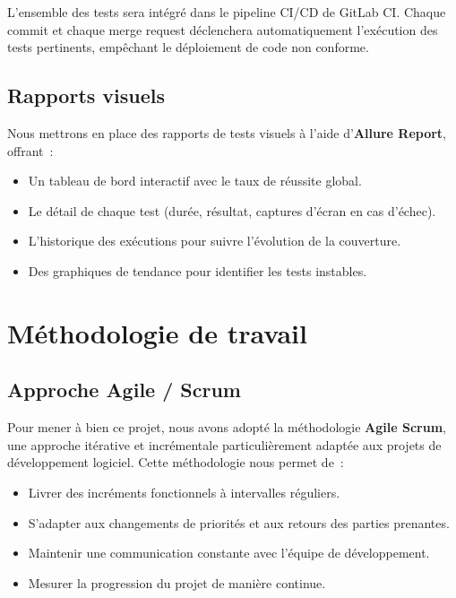 L'ensemble des tests sera intégré dans le pipeline CI/CD de GitLab CI. Chaque commit et chaque merge request déclenchera automatiquement l'exécution des tests pertinents, empêchant le déploiement de code non conforme.

\subsection{Rapports visuels}
\label{subsec:rapports-visuels}

Nous mettrons en place des rapports de tests visuels à l'aide d'\textbf{Allure Report}, offrant~:

\begin{itemize}
    \item Un tableau de bord interactif avec le taux de réussite global.
    \item Le détail de chaque test (durée, résultat, captures d'écran en cas d'échec).
    \item L'historique des exécutions pour suivre l'évolution de la couverture.
    \item Des graphiques de tendance pour identifier les tests instables.
\end{itemize}

\section{Méthodologie de travail}
\label{sec:methodologie-travail}

\subsection{Approche Agile / Scrum}
\label{subsec:approche-agile}

Pour mener à bien ce projet, nous avons adopté la méthodologie \textbf{Agile Scrum}, une approche itérative et incrémentale particulièrement adaptée aux projets de développement logiciel. Cette méthodologie nous permet de~:

\begin{itemize}
    \item Livrer des incréments fonctionnels à intervalles réguliers.
    \item S'adapter aux changements de priorités et aux retours des parties prenantes.
    \item Maintenir une communication constante avec l'équipe de développement.
    \item Mesurer la progression du projet de manière continue.
\end{itemize}


